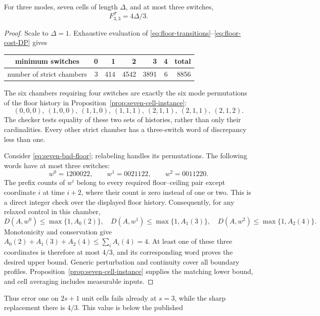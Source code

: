\begin{theorem}\label{thm:seven-cells}
For three modes, seven cells of length $\Delta$, and at most three switches,
\begin{equation}\label{eq:seven-cells}
 F^{\mathcal T}_{3,3}=4\Delta/3.
\end{equation}
\end{theorem}
\begin{proof}
Scale to $\Delta=1$. Exhaustive evaluation of
\eqref{eq:floor-transitions}--\eqref{eq:floor-cost-DP} gives
\begin{center}
\begin{tabular}{c|rrrrr|r}
minimum switches&0&1&2&3&4&total\\\hline
number of strict chambers&3&414&4542&3891&6&8856
\end{tabular}
\end{center}
The six chambers requiring four switches are exactly the six mode
permutations of the floor history in
Proposition~\ref{prop:seven-cell-instance}:
\begin{equation}\label{eq:seven-bad-floor}
 (0,0,0),\ (1,0,0),\ (1,1,0),\ (1,1,1),\
 (2,1,1),\ (2,1,1),\ (2,1,2).
\end{equation}
The checker tests equality of these two sets of histories, rather than only
their cardinalities. Every other strict chamber has a three-switch word
of discrepancy less than one.

Consider \eqref{eq:seven-bad-floor}; relabeling handles its permutations.
The following words have at most three switches:
\[
 w^0=1200022,\qquad w^1=0021122,\qquad w^2=0011220.
\]
The prefix counts of $w^i$ belong to every required floor--ceiling pair
except coordinate $i$ at time $i+2$, where their count is zero instead
of one or two. This is a direct integer check over the displayed floor
history. Consequently, for any relaxed control in this chamber,
\[
 D(A,w^0)\le\max\{1,A_0(2)\},\quad
 D(A,w^1)\le\max\{1,A_1(3)\},\quad
 D(A,w^2)\le\max\{1,A_2(4)\}.
\]
Monotonicity and conservation give
$A_0(2)+A_1(3)+A_2(4)\le\sum_i A_i(4)=4$.
At least one of these three coordinates is therefore at most $4/3$,
and its corresponding word proves the desired upper bound.
Generic perturbation and continuity cover all boundary profiles.
Proposition~\ref{prop:seven-cell-instance} supplies the matching lower
bound, and cell averaging includes measurable inputs.
\end{proof}
Thus error one on $2s+1$ unit cells fails already at $s=3$, while the
sharp replacement there is $4/3$. This value is below the published

